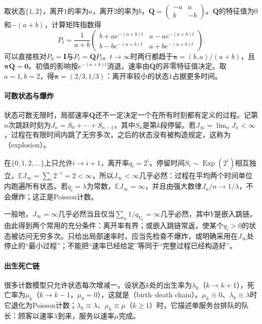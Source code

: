 \begin{example}[两态链的转移概率]
  \label{ex:ctsp-two-state}
  取状态$\{1,2\}$，离开$1$的率为$a$，离开$2$的率为$b$，$\bm Q=\begin{pmatrix}-a&a\\b&-b\end{pmatrix}$。$\bm Q$的特征值为$0$和$-(a+b)$，计算矩阵指数得
  \[
    P_t=\frac1{a+b}\begin{pmatrix}b+ae^{-(a+b)t}&a-ae^{-(a+b)t}\\b-be^{-(a+b)t}&a+be^{-(a+b)t}\end{pmatrix}.
  \]
  可以直接核对$P_0=\bm I$与$\dot P_t=\bm QP_t$。$t\to\infty$时两行都趋于$\bm\pi=(b,a)/(a+b)$，且$\bm\pi\bm Q=\bm0$。初值的影响按$e^{-(a+b)t}$消退，速率由$\bm Q$的非零特征值决定。取$a=1,b=2$，得$\bm\pi=(2/3,1/3)$：离开率较小的状态$1$占据更多时间。
\end{example}

\paragraph{可数状态与爆炸}
状态可数无限时，局部速率$\bm Q$还不一定决定一个在所有时刻都有定义的过程。记第$n$次跳跃时刻为$J_n=S_0+\cdots+S_{n-1}$，其中$S_k$是第$k$段停留。若$J_\infty=\lim_nJ_n<\infty$，过程在有限时间内跳了无穷多次，之后的状态没有被构造规定，这称为（explosion）。

\begin{example}[纯生过程的爆炸]
  \label{ex:ctsp-explosion}
  在$\{0,1,2,\ldots\}$上只允许$i\to i+1$，离开率$q_i=2^i$。停留时间$S_i\sim\operatorname{Exp}(2^i)$相互独立，$\mathbb EJ_\infty=\sum_i2^{-i}=2<\infty$，所以$J_\infty<\infty$几乎必然：过程在平均两个时间单位内跑遍所有状态。若$q_i=\lambda$为常数，$\mathbb EJ_\infty=\infty$，并且由强大数律$J_n/n\to1/\lambda$，不会爆炸；这正是Poisson计数。
\end{example}

一般地，$J_\infty=\infty$几乎必然当且仅当$\sum_n1/q_{Y_n}=\infty$几乎必然，其中$Y$是嵌入跳链。由此得到两个常用的充分条件：离开率有界；或嵌入跳链常返，使某个$q_i>0$的状态被访问无穷多次。只给出局部速率时，应当先检查不爆炸，或明确采用在$J_\infty$处停止的“最小过程”；不能把“速率已经给定”等同于“完整过程已经构造好”。

\paragraph{出生死亡链}
很多计数模型只允许状态每次增减一。设状态$k$处的出生率为$\lambda_k$（$k\to k+1$），死亡率为$\mu_k$（$k\to k-1$，$\mu_0=0$），这就是（birth--death chain）。$\mu_k\equiv0$、$\lambda_k\equiv\lambda$时它退化为Poisson计数；$\lambda_k\equiv\lambda$、$\mu_k\equiv\mu$（$k\geq1$）时，它描述单服务台排队的队长：顾客以速率$\lambda$到来，服务以速率$\mu$完成。

